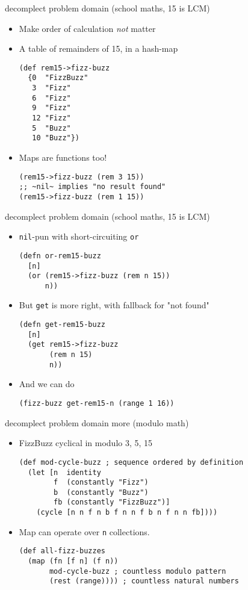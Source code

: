 \documentclass[presentation]{beamer}
\begin{document}
\begin{frame}[label={sec:org9629f8b},fragile]{decomplect problem domain (school maths, 15 is LCM)}
 \begin{itemize}
\item Make order of calculation \emph{not} matter
\item A table of remainders of 15, in a hash-map
\begin{verbatim}
(def rem15->fizz-buzz
  {0  "FizzBuzz"
   3  "Fizz"
   6  "Fizz"
   9  "Fizz"
   12 "Fizz"
   5  "Buzz"
   10 "Buzz"})
\end{verbatim}
\item Maps are functions too!
\begin{verbatim}
(rem15->fizz-buzz (rem 3 15))
;; ~nil~ implies "no result found"
(rem15->fizz-buzz (rem 1 15))
\end{verbatim}
\end{itemize}
\end{frame}
\begin{frame}[label={sec:org5aae148},fragile]{decomplect problem domain (school maths, 15 is LCM)}
 \begin{itemize}
\item \texttt{nil}-pun with short-circuiting \alert{\texttt{or}}
\begin{verbatim}
(defn or-rem15-buzz
  [n]
  (or (rem15->fizz-buzz (rem n 15))
      n))
\end{verbatim}

\item But \alert{\texttt{get}} is more right, with fallback for "not found"
\begin{verbatim}
(defn get-rem15-buzz
  [n]
  (get rem15->fizz-buzz
       (rem n 15)
       n))
\end{verbatim}

\item And we can do
\begin{verbatim}
(fizz-buzz get-rem15-n (range 1 16))
\end{verbatim}
\end{itemize}
\end{frame}
\begin{frame}[label={sec:orge65911d},fragile]{decomplect problem domain more (modulo math)}
 \begin{itemize}
\item FizzBuzz cyclical in modulo 3, 5, 15
\begin{verbatim}
(def mod-cycle-buzz ; sequence ordered by definition
  (let [n  identity
        f  (constantly "Fizz")
        b  (constantly "Buzz")
        fb (constantly "FizzBuzz")]
    (cycle [n n f n b f n n f b n f n n fb])))
\end{verbatim}
\item Map can operate over \texttt{n} collections.
\begin{verbatim}
(def all-fizz-buzzes
  (map (fn [f n] (f n))
       mod-cycle-buzz ; countless modulo pattern
       (rest (range)))) ; countless natural numbers
\end{verbatim}
\end{itemize}
\end{frame}
\end{document}
